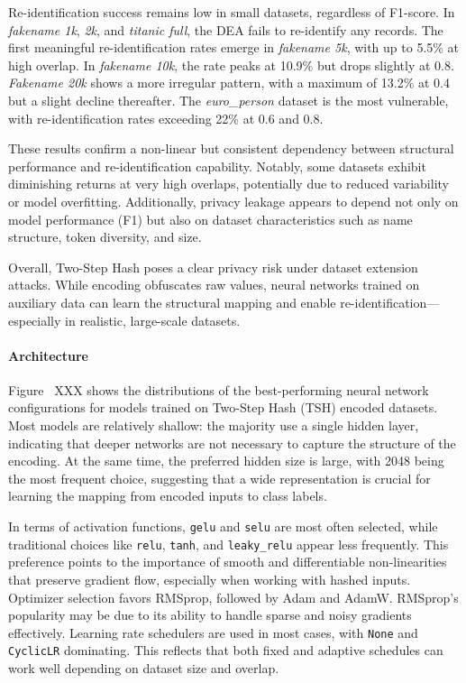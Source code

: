 Re-identification success remains low in small datasets, regardless of F1-score. In \textit{fakename 1k}, \textit{2k}, and \textit{titanic full}, the DEA fails to re-identify any records. The first meaningful re-identification rates emerge in \textit{fakename 5k}, with up to 5.5\% at high overlap. In \textit{fakename 10k}, the rate peaks at 10.9\% but drops slightly at 0.8. \textit{Fakename 20k} shows a more irregular pattern, with a maximum of 13.2\% at 0.4 but a slight decline thereafter. The \textit{euro\_person} dataset is the most vulnerable, with re-identification rates exceeding 22\% at 0.6 and 0.8.

These results confirm a non-linear but consistent dependency between structural performance and re-identification capability. Notably, some datasets exhibit diminishing returns at very high overlaps, potentially due to reduced variability or model overfitting. Additionally, privacy leakage appears to depend not only on model performance (F1) but also on dataset characteristics such as name structure, token diversity, and size.

Overall, Two-Step Hash poses a clear privacy risk under dataset extension attacks. While encoding obfuscates raw values, neural networks trained on auxiliary data can learn the structural mapping and enable re-identification—especially in realistic, large-scale datasets.

\paragraph{Architecture}

Figure~ XXX shows the distributions of the best-performing neural network configurations for models trained on Two-Step Hash (TSH) encoded datasets. Most models are relatively shallow: the majority use a single hidden layer, indicating that deeper networks are not necessary to capture the structure of the encoding. At the same time, the preferred hidden size is large, with 2048 being the most frequent choice, suggesting that a wide representation is crucial for learning the mapping from encoded inputs to class labels.

In terms of activation functions, \texttt{gelu} and \texttt{selu} are most often selected, while traditional choices like \texttt{relu}, \texttt{tanh}, and \texttt{leaky\_relu} appear less frequently. This preference points to the importance of smooth and differentiable non-linearities that preserve gradient flow, especially when working with hashed inputs. Optimizer selection favors RMSprop, followed by Adam and AdamW. RMSprop’s popularity may be due to its ability to handle sparse and noisy gradients effectively. Learning rate schedulers are used in most cases, with \texttt{None} and \texttt{CyclicLR} dominating. This reflects that both fixed and adaptive schedules can work well depending on dataset size and overlap.

